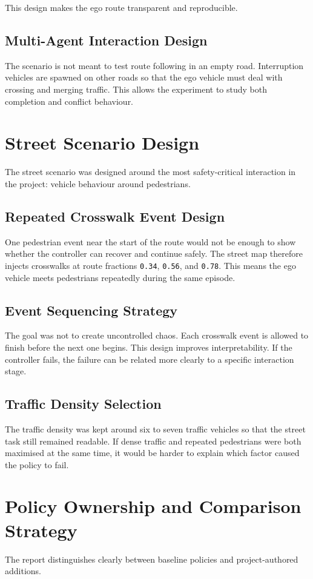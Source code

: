 \documentclass[12pt,a4paper]{report}
\begin{document}
This design makes the ego route transparent and reproducible.

\subsection{Multi-Agent Interaction Design}
The scenario is not meant to test route following in an empty road. Interruption vehicles are spawned on other roads so that the ego vehicle must deal with crossing and merging traffic. This allows the experiment to study both completion and conflict behaviour.

\section{Street Scenario Design}
The street scenario was designed around the most safety-critical interaction in the project: vehicle behaviour around pedestrians.

\subsection{Repeated Crosswalk Event Design}
One pedestrian event near the start of the route would not be enough to show whether the controller can recover and continue safely. The street map therefore injects crosswalks at route fractions \texttt{0.34}, \texttt{0.56}, and \texttt{0.78}. This means the ego vehicle meets pedestrians repeatedly during the same episode.

\subsection{Event Sequencing Strategy}
The goal was not to create uncontrolled chaos. Each crosswalk event is allowed to finish before the next one begins. This design improves interpretability. If the controller fails, the failure can be related more clearly to a specific interaction stage.

\subsection{Traffic Density Selection}
The traffic density was kept around six to seven traffic vehicles so that the street task still remained readable. If dense traffic and repeated pedestrians were both maximised at the same time, it would be harder to explain which factor caused the policy to fail.

\section{Policy Ownership and Comparison Strategy}
The report distinguishes clearly between baseline policies and project-authored additions.
\end{document}
